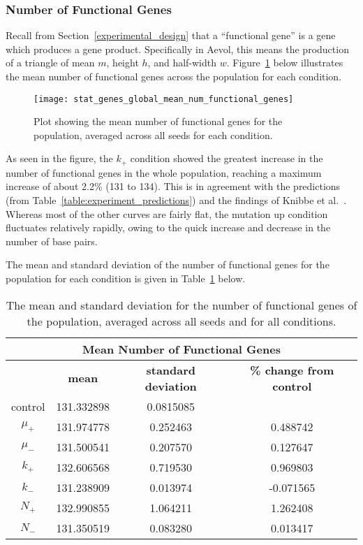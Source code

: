 \subsubsection{Number of Functional Genes}\label{sec:number_of_functional_genes}
Recall from Section~\ref{experimental_design} that a ``functional gene'' is a gene which produces a gene product. Specifically in Aevol, this means the production of a triangle of mean $m$, height $h$, and half-width $w$. Figure~\ref{fig:mean_num_functional_genes} below illustrates the mean number of functional genes across the population for each condition.  
\begin{figure}[H]
	\centering
	\texttt{[image: stat\_genes\_global\_mean\_num\_functional\_genes]}
	\caption[Mean number of functional genes]{Plot showing the mean number of functional genes for the population, averaged across all seeds for each condition.}
	\label{fig:mean_num_functional_genes}
\end{figure}
As seen in the figure, the $k_+$ condition showed the greatest increase in the number of functional genes in the whole population, reaching a maximum increase of about 2.2\% (131 to 134). This is in agreement with the predictions (from Table~\ref{table:experiment_predictions}) and the findings of Knibbe et al.~\cite{Knibbe2007}. Whereas most of the other curves are fairly flat, the mutation up condition fluctuates relatively rapidly, owing to the quick increase and decrease in the number of base pairs. 

The mean and standard deviation of the number of functional genes for the population for each condition is given in Table~\ref{table:number_of_genes_mean_std_dev} below.

\begin{table}[H]
	\centering
	\begin{tabular}{|c|c|c|c|}
		\hline
		\multicolumn{4}{c}{\Large \textbf{Mean Number of Functional Genes}} \\
		\hline
		& \textbf{mean} & \textbf{standard deviation} & \textbf{\% change from control} \\
		\hline
		control & 131.332898 & 0.0815085 & \textemdash \\ 
		\hline
		$\mu_+$ & 131.974778 & 0.252463 & 0.488742 \\ 
		\hline
		$\mu_-$ & 131.500541 & 0.207570 & 0.127647 \\ 
		\hline
		$k_+$ & 132.606568 & 0.719530 & 0.969803 \\ 
		\hline
		$k_-$ & 131.238909 & 0.013974 & -0.071565 \\ 
		\hline
		$N_+$ & 132.990855 & 1.064211 & 1.262408 \\ 
		\hline
		$N_-$ & 131.350519 & 0.083280 & 0.013417 \\ 
		\hline
	\end{tabular}
	\caption[Number of functional genes - mean and standard deviation]{The mean and standard deviation for the number of functional genes of the population, averaged across all seeds and for all conditions.}
	\label{table:number_of_genes_mean_std_dev}
\end{table}
